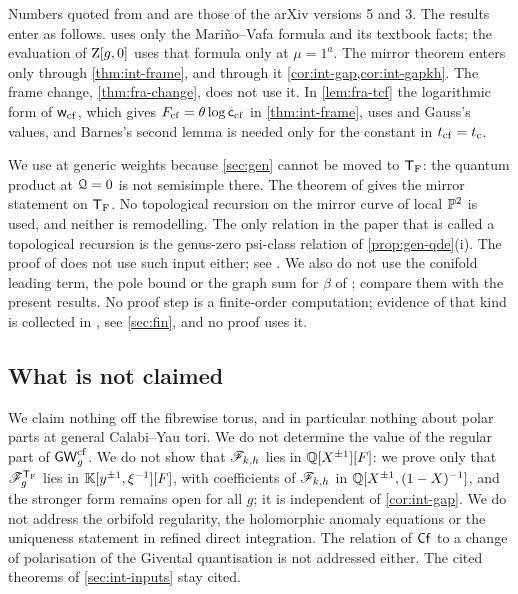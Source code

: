 Numbers quoted from \cite{CCIT15} and \cite{Tel12} are those of the arXiv versions 5 and 3. The results enter as follows.  uses only the Mari\~no--Vafa formula and its textbook facts; the evaluation of $\mathrm{Z}[g,0]$ uses that formula only at $\mu=1^a$. The mirror theorem enters only through \cref{thm:int-frame}, and through it \cref{cor:int-gap,cor:int-gapkh}. The frame change, \cref{thm:fra-change}, does not use it. In \cref{lem:fra-tcf} the logarithmic form of $\mathsf{w}_{\mathrm{cf}}$, which gives $F_{\mathrm{cf}}=\theta\log\mathsf{c}_{\mathrm{cf}}$ in \cref{thm:int-frame}, uses \cite[Eq.~15.6.7]{DLMF} and Gauss's values, and Barnes's second lemma is needed only for the constant in $t_{\mathrm{cf}}=t_{\mathrm{c}}$.

We use \cite[Theorem~31]{CCIT15} at generic weights because \cref{sec:gen} cannot be moved to $\mathsf{T}_{\mathrm{F}}$: the quantum product at $\mathcal{Q}=0$ is not semisimple there. The theorem of \cite{Coa09} gives the mirror statement on $\mathsf{T}_{\mathrm{F}}$. No topological recursion on the mirror curve of local $\mathbb{P}^2$ is used, and neither is remodelling. The only relation in the paper that is called a topological recursion is the genus-zero psi-class relation of \cref{prop:gen-qde}(i). The proof of \cite[Theorem~31]{CCIT15} does not use such input either; see . We also do not use the conifold leading term, the pole bound or the graph sum for $\beta$ of \cite{BS};  compare them with the present results. No proof step is a finite-order computation; evidence of that kind is collected in , see \cref{sec:fin}, and no proof uses it.

\subsection{What is not claimed}
\label{sec:int-notclaimed}

We claim nothing off the fibrewise torus, and in particular nothing about polar parts at general Calabi--Yau tori. We do not determine the value of the regular part of $\mathsf{GW}^{\mathrm{cf}}_g$. We do not show that $\mathscr{F}_{k,h}$ lies in $\mathbb{Q}[X^{\pm1}][F]$: we prove only that $\mathscr{F}_g^{\mathsf{T}_{\mathrm{F}}}$ lies in $\mathbb{K}[y^{\pm1},\xi^{-1}][F]$, with coefficients of $\mathscr{F}_{k,h}$ in $\mathbb{Q}[X^{\pm1},(1-X)^{-1}]$, and the stronger form remains open for all $g$; it is independent of \cref{cor:int-gap}. We do not address the orbifold regularity, the holomorphic anomaly equations or the uniqueness statement in refined direct integration. The relation of $\mathsf{Cf}$ to a change of polarisation of the Givental quantisation is not addressed either. The cited theorems of \cref{sec:int-inputs} stay cited.

